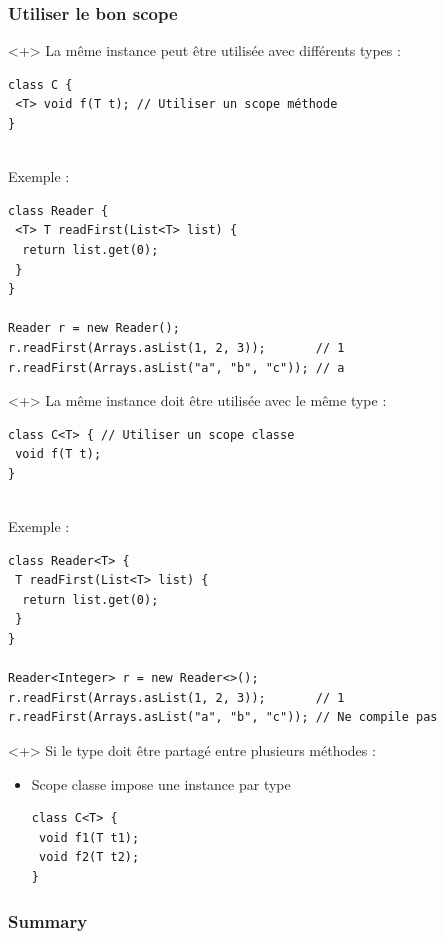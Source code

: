 \documentclass[draft]{beamer}
\DeclareRobustCommand{\todo}[1]{\ifdraft{\textbf{\textcolor{red}{[#1]}}}{}}
\begin{document}
\begin{frame}[fragile]
\frametitle{Utiliser le bon scope}
\begin{onlyenv}<+>
La même instance peut être utilisée avec différents types :
\begin{lstlisting}
class C {
 <T> void f(T t); // Utiliser un scope méthode
}
\end{lstlisting}
~\\
Exemple :
\begin{lstlisting}
class Reader {
 <T> T readFirst(List<T> list) {
  return list.get(0);
 }
}

Reader r = new Reader();
r.readFirst(Arrays.asList(1, 2, 3));       // 1
r.readFirst(Arrays.asList("a", "b", "c")); // a
\end{lstlisting}
\end{onlyenv}
\begin{onlyenv}<+>
La même instance doit être utilisée avec le même type :
\begin{lstlisting}
class C<T> { // Utiliser un scope classe
 void f(T t);
}
\end{lstlisting}
~\\
Exemple :
\begin{lstlisting}
class Reader<T> {
 T readFirst(List<T> list) {
  return list.get(0);
 }
}

Reader<Integer> r = new Reader<>();
r.readFirst(Arrays.asList(1, 2, 3));       // 1
r.readFirst(Arrays.asList("a", "b", "c")); // Ne compile pas
\end{lstlisting}
\end{onlyenv}
\begin{onlyenv}<+>
Si le type doit être partagé entre plusieurs méthodes :
\begin{itemize}
 \item Scope classe impose une instance par type
\begin{lstlisting}
class C<T> {
 void f1(T t1);
 void f2(T t2);
}
\end{lstlisting}
\end{itemize}
\end{onlyenv}
\end{frame}

\appendix
{}
\setcounter{finalframe}{\value{framenumber}}

\scriptsize

\normalsize

\begin{frame}
\frametitle{Summary}
\todo{todo}
\end{frame}

\setcounter{framenumber}{\value{finalframe}}
\end{document}
